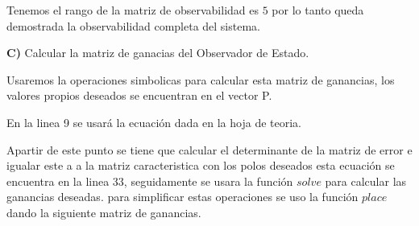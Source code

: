 \documentclass[12pt]{article}
\begin{document}
Tenemos el rango de la matriz de observabilidad es $5$ por lo tanto queda demostrada la observabilidad completa del sistema.

\vspace{10mm}
\textbf{C)} Calcular la matriz de ganacias del Observador de Estado.
\vspace{10mm}

Usaremos la operaciones simbolicas para calcular esta matriz de ganancias, los valores propios deseados se encuentran en el vector P.

En la linea 9 se usará la ecuación dada en la hoja de teoria.

Apartir de este punto se tiene que calcular el determinante de la matriz de error e igualar este a a la matriz caracteristica con los polos deseados esta ecuación se encuentra en la linea 33, seguidamente se usara la función $solve$ para calcular las ganancias deseadas. para simplificar estas operaciones se uso la función $place$ dando la siguiente matriz de ganancias.

\end{document}
